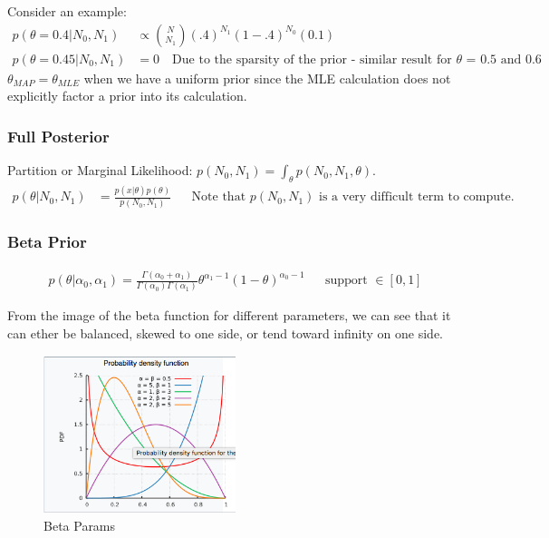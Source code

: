 \documentclass{article}
\begin{document}
\smallskip

\noindent Consider an example:
\begin{align*}
p(\theta=0.4|N_0,N_1) &\propto {N \choose N_1} (.4)^{N_1}(1-.4)^{N_0} (0.1) \\
p(\theta=0.45|N_0,N_1) &= 0 \quad \text{Due to the sparsity of the prior - similar result for $\theta$ = 0.5 and 0.6}
\end{align*}
\noindent $\theta_{MAP} = \theta_{MLE}$ when we have a uniform prior since the MLE calculation does not explicitly factor a prior into its calculation.

\subsubsection*{Full Posterior}
Partition or Marginal Likelihood: $p(N_0,N_1) = \int_\theta p(N_0,N_1,\theta)$. 
\begin{align*}
p(\theta|N_0,N_1) &= \frac{p(x|\theta) p(\theta)}{p(N_0,N_1)} && \text{Note that $p(N_0,N_1)$ is a very difficult term to compute.}
\end{align*}

\subsubsection*{Beta Prior}
\begin{align*}
p(\theta|\alpha_0,\alpha_1) = \frac{\Gamma(\alpha_0 + \alpha_1)}{\Gamma(\alpha_0)\Gamma(\alpha_1)} \theta^{\alpha_1-1} (1-\theta)^{\alpha_0-1}  && \text{support $\in [0,1]$}
\end{align*}

\noindent From the image of the beta function for different parameters, we can see that it can ether be balanced, skewed to one side, or tend toward infinity on one side.
\begin{figure}
\centering
\includegraphics[width=0.5\textwidth]{./beta.png}
\caption{Beta Params}
\end{figure}
\end{document}
